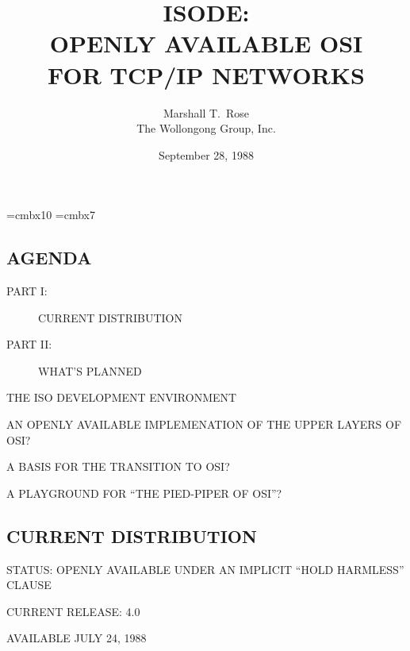 

\font\xx=cmbx10
\font\yy=cmbx7

\raggedright


\let\tradeNAMfont=\relax
\let\tradeORGfont=\relax



\title	{ISODE:\\ OPENLY AVAILABLE OSI\\ FOR TCP/IP NETWORKS}
\author	{Marshall T.~Rose\\ The Wollongong Group, Inc.}
\date	{September 28, 1988}
\maketitlepage


\begin{bwslide}
\part*	{AGENDA}\bf

\begin{description}
\item[PART I:]		CURRENT DISTRIBUTION

\item[PART II:]		WHAT'S PLANNED
\end{description}
\end{bwslide}


\begin{bwslide}

\begin{nrtc}
\item	THE ISO DEVELOPMENT ENVIRONMENT

\item	AN OPENLY AVAILABLE IMPLEMENATION OF THE UPPER LAYERS OF OSI?

\item	A BASIS FOR THE TRANSITION TO OSI?

\item	A PLAYGROUND FOR ``THE PIED-PIPER OF OSI''?
\end{nrtc}
\end{bwslide}


\begin{bwslide}
\part	{CURRENT DISTRIBUTION}\bf

\begin{nrtc}
\item	STATUS: OPENLY AVAILABLE UNDER AN IMPLICIT ``HOLD HARMLESS'' CLAUSE

\item	CURRENT RELEASE: 4.0
    \begin{nrtc}
    \item	AVAILABLE JULY 24, 1988
    \end{nrtc}
\end{nrtc}
\end{bwslide}


